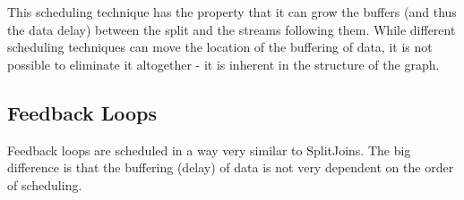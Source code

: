 This scheduling technique has the property that it can grow the buffers
(and thus the data delay) between the split and the streams following
them.  While different scheduling techniques can move the location of the
buffering of data, it is not possible to eliminate it altogether - it is
inherent in the structure of the graph.

\subsection{Feedback Loops}

Feedback loops are scheduled in a way very similar to SplitJoins.  The big
difference is that the buffering (delay) of data is not very dependent on
the order of scheduling.

